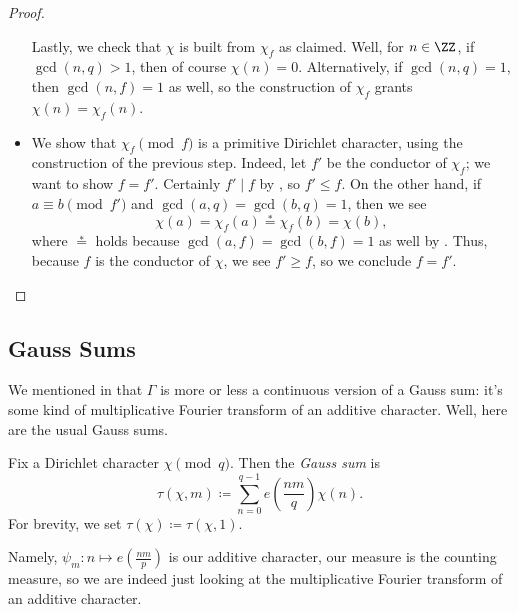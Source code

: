 \documentclass[../notes.tex]{subfiles}
\begin{document}
\begin{proof}
\begin{itemize}
		Lastly, we check that $\chi$ is built from $\chi_f$ as claimed. Well, for $n\in\ZZ$, if $\gcd(n,q)>1$, then of course $\chi(n)=0$. Alternatively, if $\gcd(n,q)=1$, then $\gcd(n,f)=1$ as well, so the construction of $\chi_f$ grants $\chi(n)=\chi_f(n)$.

		\item We show that $\chi_f\pmod f$ is a primitive Dirichlet character, using the construction of the previous step. Indeed, let $f'$ be the conductor of $\chi_f$; we want to show $f=f'$. Certainly $f'\mid f$ by , so $f'\le f$. On the other hand, if $a\equiv b\pmod{f'}$ and $\gcd(a,q)=\gcd(b,q)=1$, then we see
		\[\chi(a)=\chi_f(a)\stackrel*=\chi_f(b)=\chi(b),\]
		where $\stackrel*=$ holds because $\gcd(a,f)=\gcd(b,f)=1$ as well by . Thus, because $f$ is the conductor of $\chi$, we see $f'\ge f$, so we conclude $f=f'$.
		\qedhere
	\end{itemize}
\end{proof}

\subsection{Gauss Sums}
We mentioned in  that $\Gamma$ is more or less a continuous version of a Gauss sum: it's some kind of multiplicative Fourier transform of an additive character. Well, here are the usual Gauss sums.
\begin{definition}
	Fix a Dirichlet character $\chi\pmod q$. Then the \textit{Gauss sum} is
	\[\tau(\chi,m)\coloneqq\sum_{n=0}^{q-1}e\left(\frac{nm}q\right)\chi(n).\]
	For brevity, we set $\tau(\chi)\coloneqq\tau(\chi,1)$.
\end{definition}
Namely, $\psi_m\colon n\mapsto e\left(\frac{nm}p\right)$ is our additive character, our measure is the counting measure, so we are indeed just looking at the multiplicative Fourier transform of an additive character.
\end{document}

